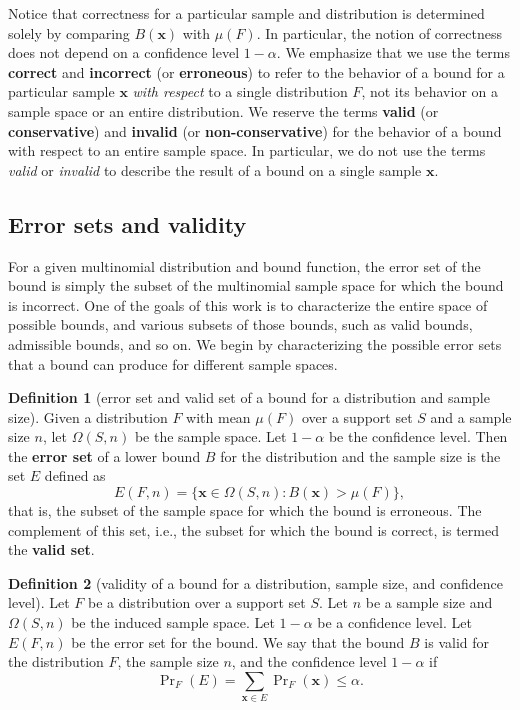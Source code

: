 \documentclass{article}
\theoremstyle{definition}
\newtheorem{definition}{Definition}[section]
\theoremstyle{remark}
\def\x{\mathbf{x}}
\begin{document}
Notice that correctness for a particular sample and distribution is determined solely by comparing $B(\x)$ with $\mu(F)$. In particular, the notion of correctness does not depend on a confidence level $1-\alpha$. We emphasize that we use the terms {\bf correct} and {\bf incorrect} (or {\bf erroneous}) to refer to the behavior of a bound for a particular sample $\x$ \textit{with respect} to a single distribution $F$, not its behavior on a sample space or an entire distribution. We reserve the terms {\bf valid} (or {\bf conservative}) and {\bf invalid} (or {\bf non-conservative}) for the behavior of a bound with respect to an entire sample space. In particular, we do not use the terms {\em valid} or {\em invalid} to describe the result of a bound on a single sample $\x$. 

\subsection{Error sets and validity}
For a given multinomial distribution and bound function, 
the error set of the bound is simply the subset of the multinomial sample space for which the bound is incorrect. One of the goals of this work is to characterize the entire space of possible bounds, and various subsets of those bounds, such as valid bounds, admissible bounds, and so on. We begin by characterizing the possible error sets that a bound can produce for different sample spaces. 

\begin{definition}[error set and valid set of a bound for a distribution and sample size]
\label{def:error_set_of_valid_bound}
Given a distribution $F$ with mean $\mu(F)$ over a support set $S$ and a sample size $n$, let $\Omega(S,n)$ be the sample space. Let $1-\alpha$ be the confidence level. Then the {\bf error set} of a lower bound $B$ for the distribution and the sample size is the set $E$ defined as 
$$
E(F,n) = \{\x\in \Omega(S,n): B(\x) > \mu(F)\},
$$  
that is, the subset of the sample space for which the bound is erroneous. The complement of this set, i.e., the subset for which the bound is correct, is termed the {\bf valid set}.
\end{definition}

\begin{definition}[validity of a bound for a distribution, sample size, and confidence level]
Let $F$ be a distribution over a support set $S$. Let $n$ be a sample size and $\Omega(S,n)$ be the induced sample space. Let $1-\alpha$ be a confidence level. Let $E(F,n)$ be the error set for the bound. We say that the bound $B$ is valid for the distribution $F$, the sample size $n$, and the confidence level $1-\alpha$ if 
$$
\Pr\nolimits_F(E) = \sum_{\x\in E} \Pr\nolimits_F(\x) \leq \alpha.
$$
\end{definition}
\end{document}
